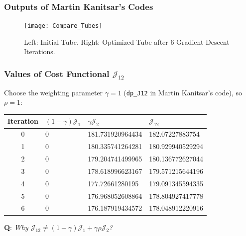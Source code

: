 \documentclass[t,xcolor=table,english]{beamer}   %
\begin{document}
\begin{frame}
	\frametitle{Outputs of Martin Kanitsar's Codes}
	\begin{figure}
		\centering
		\texttt{[image: Compare\_Tubes]}
		\caption{Left: Initial Tube. Right: Optimized Tube after 6 Gradient-Descent Iterations.}
	\end{figure}
\end{frame}

\begin{frame}
	\frametitle{Values of Cost Functional $\mathcal{J}_{12}$}
	Choose the weighting parameter $\gamma = 1$ (\texttt{dp\_J12} in Martin Kanitsar's code), so $\rho = 1$:
	
	\begin{table}
		\centering
		\begin{tabular}{|c|l|l|l|}
			\hline
			\textbf{Iteration} & $(1 - \gamma)\mathcal{J}_1$ & $\gamma\mathcal{J}_2$ & $\mathcal{J}_{12}$ \\
			\hline
			0 & 0 & 181.731920964434 & 182.07227883754 \\
			\hline
			1 & 0 & 180.335741264281 & 180.929940529294 \\
			\hline
			2 & 0 & 179.204741499965 & 180.136772627044 \\
			\hline
			3 & 0 & 178.618996623167 & 179.571215644196 \\
			\hline
			4 & 0 & 177.72661280195 & 179.091345594335 \\
			\hline
			5 & 0 & 176.968052608864 & 178.804927417778 \\
			\hline
			6 & 0 & 176.187919434572 & 178.048912220916 \\
			\hline
		\end{tabular}
	\end{table}
	\textbf{Q}: \textit{Why $\mathcal{J}_{12}\ne(1 - \gamma)\mathcal{J}_1 + \gamma\rho\mathcal{J}_2$?}
\end{frame}
\end{document}

